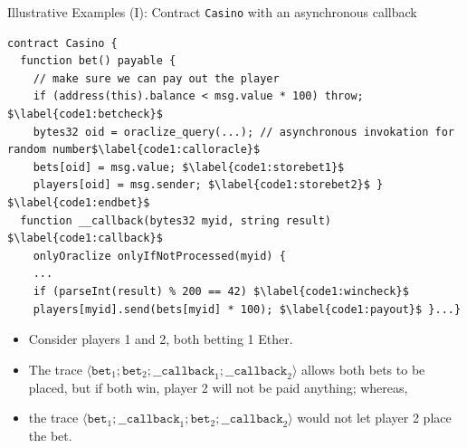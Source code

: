 \documentclass[9pt]{beamer}
\begin{document}
%
\begin{frame}[fragile]{Illustrative Examples (I): Contract \texttt{Casino} with an asynchronous callback}
\begin{lstlisting}[mathescape=true,language=Solidity,basicstyle=\scriptsize\ttfamily]
contract Casino {
  function bet() payable {
    // make sure we can pay out the player
    if (address(this).balance < msg.value * 100) throw; $\label{code1:betcheck}$
    bytes32 oid = oraclize_query(...); // asynchronous invokation for random number$\label{code1:calloracle}$
    bets[oid] = msg.value; $\label{code1:storebet1}$
    players[oid] = msg.sender; $\label{code1:storebet2}$ } $\label{code1:endbet}$
  function __callback(bytes32 myid, string result) $\label{code1:callback}$
    onlyOraclize onlyIfNotProcessed(myid) {
    ...
    if (parseInt(result) % 200 == 42) $\label{code1:wincheck}$
    players[myid].send(bets[myid] * 100); $\label{code1:payout}$ }...}
\end{lstlisting}
  \bigskip
  \begin{itemize}
  \pause\item Consider players 1 and 2, both betting 1 Ether.
  \pause\item The trace $\langle\texttt{bet}_1; \texttt{bet}_2; \texttt{\_\_callback}_1; \texttt{\_\_callback}_2\rangle$
    allows both bets to be placed, but if both win, player 2 will not be paid anything; whereas,
  \pause\item the trace $\langle\texttt{bet}_1; \texttt{\_\_callback}_1; \texttt{bet}_2; \texttt{\_\_callback}_2\rangle$
    would not let player 2 place the bet.
  \end{itemize}
\end{frame}
%
    
\end{document}
